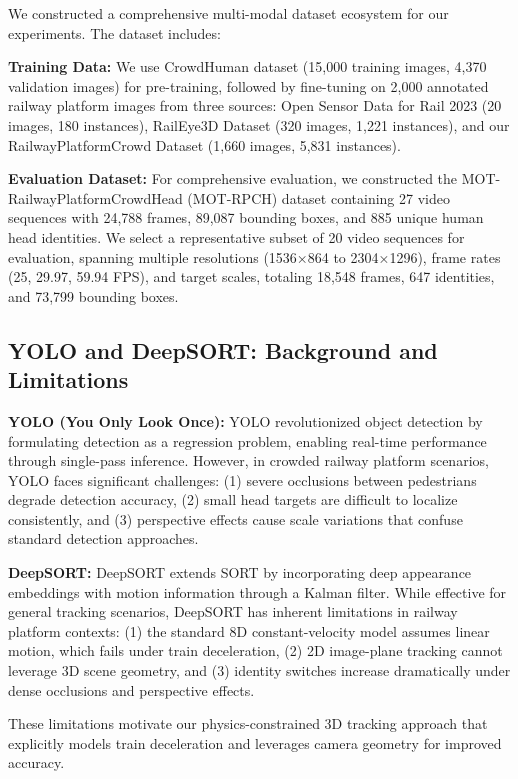 We constructed a comprehensive multi-modal dataset ecosystem for our experiments. The dataset includes:

\textbf{Training Data:} We use CrowdHuman dataset \cite{shao2018crowdhuman} (15,000 training images, 4,370 validation images) for pre-training, followed by fine-tuning on 2,000 annotated railway platform images from three sources: Open Sensor Data for Rail 2023 \cite{OpenSensorDataforRail2023} (20 images, 180 instances), RailEye3D Dataset \cite{RailEye3D_Dataset} (320 images, 1,221 instances), and our RailwayPlatformCrowd Dataset (1,660 images, 5,831 instances).

\textbf{Evaluation Dataset:} For comprehensive evaluation, we constructed the MOT-RailwayPlatformCrowdHead (MOT-RPCH) dataset containing 27 video sequences with 24,788 frames, 89,087 bounding boxes, and 885 unique human head identities. We select a representative subset of 20 video sequences for evaluation, spanning multiple resolutions (1536×864 to 2304×1296), frame rates (25, 29.97, 59.94 FPS), and target scales, totaling 18,548 frames, 647 identities, and 73,799 bounding boxes.

\subsection{YOLO and DeepSORT: Background and Limitations}

\textbf{YOLO (You Only Look Once):} YOLO \cite{redmon2016you} revolutionized object detection by formulating detection as a regression problem, enabling real-time performance through single-pass inference. However, in crowded railway platform scenarios, YOLO faces significant challenges: (1) severe occlusions between pedestrians degrade detection accuracy, (2) small head targets are difficult to localize consistently, and (3) perspective effects cause scale variations that confuse standard detection approaches.

\textbf{DeepSORT:} DeepSORT \cite{211} extends SORT by incorporating deep appearance embeddings with motion information through a Kalman filter. While effective for general tracking scenarios, DeepSORT has inherent limitations in railway platform contexts: (1) the standard 8D constant-velocity model assumes linear motion, which fails under train deceleration, (2) 2D image-plane tracking cannot leverage 3D scene geometry, and (3) identity switches increase dramatically under dense occlusions and perspective effects.

These limitations motivate our physics-constrained 3D tracking approach that explicitly models train deceleration and leverages camera geometry for improved accuracy.

